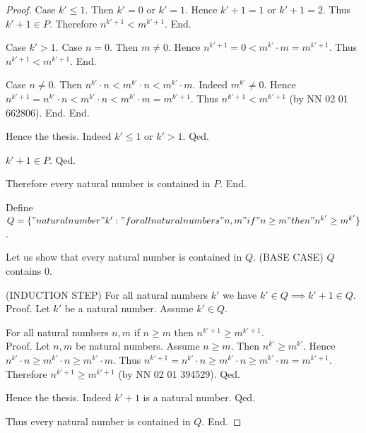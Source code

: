 \documentclass[../../natural-numbers.ftl.tex]{subfiles}
\begin{document}
\begin{forthel}
\begin{proof}
            Case $k' \leq 1$.
              Then $k' = 0$ or $k' = 1$.
              Hence $k' + 1 = 1$ or $k' + 1 = 2$.
              Thus $k' + 1 \in P$.
              Therefore $n^{k' + 1} < m^{k' + 1}$.
            End.

            Case $k' > 1$.
              Case $n = 0$.
                Then $m \neq 0$.
                Hence $n^{k' + 1} = 0 < m^{k'} \cdot m = m^{k' + 1}$.
                Thus $n^{k' + 1} < m^{k' + 1}$.
              End.

              Case $n \neq 0$.
                Then $n^{k'} \cdot n < m^{k'} \cdot n < m^{k'} \cdot m$.
                Indeed $m^{k'} \neq 0$.
                Hence $n^{k' + 1} = n^{k'} \cdot n < m^{k'} \cdot n < m^{k'} \cdot m = m^{k' + 1}$.
                Thus $n^{k' + 1} < m^{k' + 1}$ (by NN 02 01 662806).
              End.
            End.

            Hence the thesis.
            Indeed $k' \leq 1$ or $k' > 1$.
          Qed.

          $k' + 1 \in P$.
        Qed.

        Therefore every natural number is contained in $P$.
      End.


      Define $Q = \{ "natural number" k' : " for all natural numbers" n,m "if" n \geq m "then" n^{k'} \geq m^{k'} \}$.

      Let us show that every natural number is contained in $Q$.
        (BASE CASE) $Q$ contains $0$.

        (INDUCTION STEP) For all natural numbers $k'$ we have $k' \in Q \implies k' + 1 \in Q$. \\
        Proof.
          Let $k'$ be a natural number.
          Assume $k' \in Q$.

          For all natural numbers $n,m$ if $n \geq m$ then $n^{k' + 1} \geq m^{k' + 1}$. \\
          Proof.
            Let $n,m$ be natural numbers.
            Assume $n \geq m$.
            Then $n^{k'} \geq m^{k'}$.
            Hence $n^{k'} \cdot n \geq m^{k'} \cdot n \geq m^{k'} \cdot m$.
            Thus $n^{k' + 1} = n^{k'} \cdot n \geq m^{k'} \cdot n \geq m^{k'} \cdot m = m^{k' + 1}$.
            Therefore $n^{k' + 1} \geq m^{k' + 1}$ (by NN 02 01 394529).
          Qed.

          Hence the thesis.
          Indeed $k' + 1$ is a natural number.
        Qed.

        Thus every natural number is contained in $Q$.
      End.



\end{proof}
\end{forthel}
\end{document}
